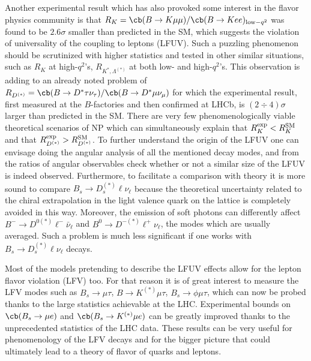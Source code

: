 Another experimental result which has also provoked some interest in the flavor physics community is that $R_K = \cb(B\to K\mu\mu)/\cb(B\to Kee)_{{\rm low}-q^2}$ was found to be $2.6\sigma$ smaller than  predicted in the SM, which suggests the violation of universality of the coupling to leptons (LFUV). Such a puzzling phenomenon should be scrutinized with higher statistics and tested in other similar situations, 
such as $R_K$ at high-$q^2$'s, $R_{K^\ast , \Lambda^{(\ast )}}$ at both low- and high-$q^2$'s. This observation is adding to an already noted problem of $R_{D^{(\ast)}}=  \cb(B\to D^{\ast}\tau\nu_\tau)/\cb(B\to D^{\ast}\mu\nu_\mu)$ for which the experimental result, first measured at the $B$-factories and then confirmed at LHCb, is $(2\div 4)\sigma$ larger than predicted in the SM. There are very few phenomenologically viable theoretical scenarios of NP which can simultaneously explain that $R_K^{\rm exp}<R_K^{\rm SM}$ and that $R_{D^{(\ast )}}^{\rm exp} > R_{D^{(\ast )}}^{\rm SM}$. To further understand the origin of the LFUV one can envisage doing the angular analysis of all the mentioned decay modes, and from the ratios of angular observables check whether or not a similar size of the LFUV is indeed observed. 
Furthermore, to facilitate a comparison with theory it is more sound to compare $B_s\to D_s^{(\ast)}\ell \nu_\ell$ because the theoretical uncertainty related to the chiral extrapolation in the light valence quark on the lattice is completely avoided in this way. Moreover, the emission of soft photons can differently affect $B^- \to D^{0 (\ast)}\ell^- \bar \nu_\ell$ and $B^0 \to D^{- (\ast)}\ell^+ \nu_\ell$, the modes which are usually averaged. Such a problem is much less significant if one works with $B_s\to D_s^{(\ast)}\ell \nu_\ell$ decays. 

Most of the models pretending to describe the LFUV effects allow for the lepton flavor violation (LFV) too. For that reason it is of great interest to measure the LFV modes such as $B_s\to \mu \tau$, $B\to K^{(\ast )}\mu \tau$,  $B_s\to \phi \mu \tau$, which can now be probed thanks to the large statistics achievable at the LHC. Experimental bounds on $\cb(B_s\to \mu e)$ and $\cb(B_s\to K^{(\ast )} \mu e)$ can be greatly improved thanks to the unprecedented statistics of the LHC data. These results can be very useful for phenomenology of the LFV decays and for the bigger picture that could ultimately lead to a theory of flavor of quarks and leptons. 


